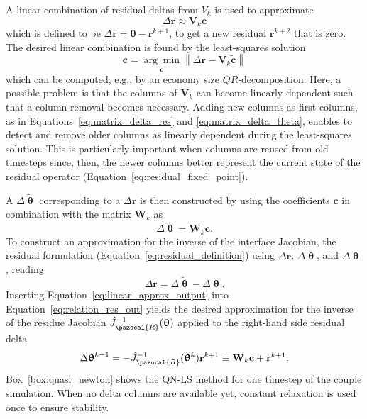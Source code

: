 A linear combination of residual deltas from \(V_{k}\) is used to approximate
\begin{equation}
\Delta \mathbf r \approx \mathbf V_{k} \mathbf c
\end{equation}
which is defined to be \(\Delta \mathbf{r}=\mathbf{0}-\mathbf{r}^{k+1}\), to get a new residual \(\mathbf{r}^{k+2}\) that is zero.
The desired linear combination is found by the least-squares solution
\begin{equation}
\mathbf{c}=\underset{\bar{\mathbf c}}{\arg \min }\left\|\Delta \mathbf{r}-\mathbf{V}_{k} \tilde{\mathbf{c}}\right\|
\end{equation}
which can be computed, e.g., by an economy size \(Q R\)-decomposition.
Here, a possible problem is that the columns of \(\mathbf{V}_{k}\) can become linearly dependent such that a column removal becomes necessary.
Adding new columns as first columns, as in Equations~\eqref{eq:matrix_delta_res} and \eqref{eq:matrix_delta_theta}, enables to detect and remove older columns as linearly dependent during the least-squares solution.
This is particularly important when columns are reused from old timesteps since, then, the newer columns better represent the current state of the residual operator (Equation~\eqref{eq:residual_fixed_point}).

A \(\Delta \tilde{\bm{\uptheta}}\) corresponding to a \(\Delta \mathbf{r}\) is then constructed by using the coefficients \(\mathbf{c}\) in combination with the matrix \(\mathbf{W}_{k}\) as
\begin{equation} \label{eq:linear_approx_output}
\Delta \tilde{\bm{\uptheta}}=\mathbf{W}_{k} \mathbf{c}.
\end{equation}
To construct an approximation for the inverse of the interface Jacobian, the residual formulation (Equation~\eqref{eq:residual_definition}) using \(\Delta \mathbf{r}\), \(\Delta \tilde{\bm{\uptheta}}\), and \(\Delta \bm{\uptheta}\), reading
\begin{equation} \label{eq:relation_res_out}
  \Delta \mathbf r = \Delta \tilde{\bm\uptheta} - \Delta\bm\uptheta.
\end{equation}
Inserting Equation~\eqref{eq:linear_approx_output} into Equation~\eqref{eq:relation_res_out} yields the desired approximation for the inverse of the residue Jacobian \(\hat{J}^{-1}_\pazocal{R}(\bm\uptheta)\) applied to the right-hand side residual delta
\begin{equation}
  \Delta \bm\uptheta^{k+1} = - \hat{J}^{-1}_\pazocal{R}(\bm\uptheta^k)\mathbf r^{k+1} \equiv \mathbf W_k \mathbf c + \mathbf r^{k+1}.
\end{equation}
Box~\eqref{box:quasi_newton} shows the QN-LS method for one timestep of the couple simulation.
When no delta columns are available yet, constant relaxation is used once to ensure stability.


